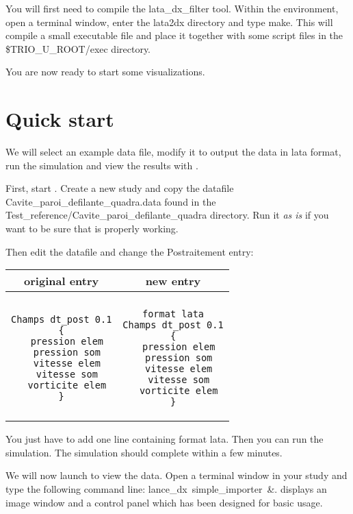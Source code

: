 \documentclass[a4paper,10pt,dvips]{article}
\begin{document}
You will first need to compile the \textsf{lata\_dx\_filter} tool.
Within the \triou environment, open a terminal window, enter the
\textsf{lata2dx} directory and type make. This will compile a small
executable file and place it together with some script files in the
\textsf{\$TRIO\_U\_ROOT/exec} directory.

You are now ready to start some visualizations.

\section{Quick start}

We will select an example data file, modify it to output the data
in \textsf{lata} format, run the simulation and view the results
with \opendx.

First, start \triou. Create a new study and copy the datafile
\textsf{Cavite\_paroi\_defilante\_quadra.data} found in the
\textsf{Test\_reference/Cavite\_paroi\_defilante\_quadra} directory.
Run it \textit{as is} if you want to be sure that \triou is properly
working.

Then edit the datafile and  change the \textsf{Postraitement} entry:
\vspace{1em}

{
\centering
\begin{tabular}{c|c}
original entry & new entry \\
\hline\\ 
\begin{minipage}{6cm}
\begin{verbatim}
Champs dt_post 0.1
{
  pression elem
  pression som
  vitesse elem
  vitesse som
  vorticite elem
}
\end{verbatim}
\end{minipage}
&
\begin{minipage}{6cm}
\begin{verbatim}
format lata
Champs dt_post 0.1
{
  pression elem
  pression som
  vitesse elem
  vitesse som
  vorticite elem
}
\end{verbatim}
\end{minipage}
\end{tabular}
\par
}
\vspace{1em}

You just have to add one line containing \textsf{format lata}. Then you
can run the simulation. The simulation should complete within a few minutes.

We will now launch \opendx to view the data. Open a terminal window in your
study and type the following command line: \textsf{lance\_dx~simple\_importer~\&}.
\opendx displays an image window and a control panel which has been designed
for basic \triou usage.
\end{document}
